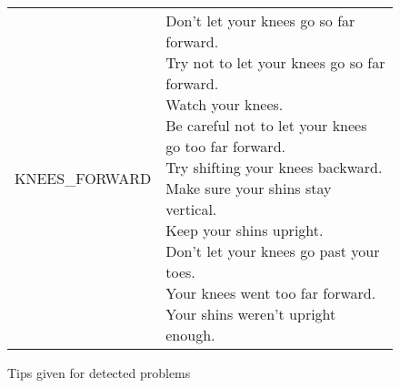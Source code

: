 \begin{figure}[H]
\begin{tabular}{ | l | p{10cm} | }
		KNEES\_FORWARD & \parbox{10cm}{\vspace{.5\baselineskip}
			Don't let your knees go so far forward. \\
			Try not to let your knees go so far forward. \\
			Watch your knees. \\
			Be careful not to let your knees go too far forward. \\
			Try shifting your knees backward. \\
			Make sure your shins stay vertical. \\
			Keep your shins upright. \\
			Don't let your knees go past your toes. \\
			Your knees went too far forward. \\
			Your shins weren't upright enough. \\} \\
		\hline
		
	\end{tabular}
\caption{Tips given for detected problems}
\label{fig:tips}
\end{figure}

